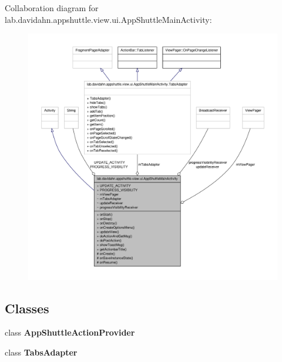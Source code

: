 \-Collaboration diagram for lab.\-davidahn.\-appshuttle.\-view.\-ui.\-App\-Shuttle\-Main\-Activity\-:
\nopagebreak
\begin{figure}[H]
\begin{center}
\leavevmode
\includegraphics[width=350pt]{classlab_1_1davidahn_1_1appshuttle_1_1view_1_1ui_1_1_app_shuttle_main_activity__coll__graph}
\end{center}
\end{figure}
\subsection*{\-Classes}
\begin{DoxyCompactItemize}
\item 
class {\bfseries \-App\-Shuttle\-Action\-Provider}
\item 
class {\bfseries \-Tabs\-Adapter}
\end{DoxyCompactItemize}
